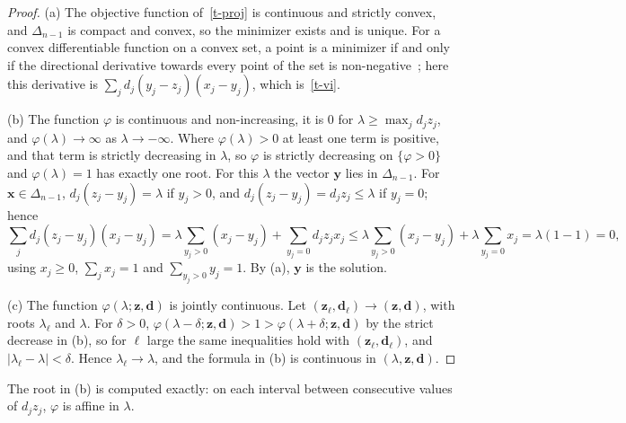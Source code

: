 \documentclass[11pt]{article}
\theoremstyle{plain}
\theoremstyle{remark}
\numberwithin{equation}{section}
\begin{document}
\begin{proof}
(a) The objective function of~\eqref{t-proj} is continuous and strictly convex,
and $\Delta_{n-1}$ is compact and convex, so the minimizer exists and is
unique. For a convex differentiable function on a convex set, a point is a
minimizer if and only if the directional derivative towards every point of the
set is non-negative~\cite[Section 4.2.3]{2004Boyd_Vandenberghe}; here this
derivative is $\sum_j d_j(y_j-z_j)(x_j-y_j)$, which is~\eqref{t-vi}.

(b) The function $\varphi$ is continuous and non-increasing, it is
$0$ for $\lambda\ge\max_j d_jz_j$, and $\varphi(\lambda)\to\infty$ as
$\lambda\to-\infty$. Where $\varphi(\lambda)>0$ at least one term is positive,
and that term is strictly decreasing in $\lambda$, so $\varphi$ is strictly
decreasing on $\{\varphi>0\}$ and $\varphi(\lambda)=1$ has exactly one root.
For this $\lambda$ the vector $\bm y$ lies in $\Delta_{n-1}$. For
$\bm x\in\Delta_{n-1}$, $d_j(z_j-y_j)=\lambda$ if $y_j>0$, and
$d_j(z_j-y_j)=d_jz_j\le\lambda$ if $y_j=0$; hence
\begin{equation}
\sum_j d_j(z_j-y_j)(x_j-y_j)
=\lambda\sum_{y_j>0}(x_j-y_j)+\sum_{y_j=0}d_jz_jx_j
\le\lambda\sum_{y_j>0}(x_j-y_j)+\lambda\sum_{y_j=0}x_j
=\lambda\left(1-1\right)=0,
\end{equation}
using $x_j\ge 0$, $\sum_jx_j=1$ and $\sum_{y_j>0}y_j=1$. By (a), $\bm y$ is the
solution.

(c) The function $\varphi(\lambda;\bm z,\bm d)$ is jointly continuous. Let
$(\bm z_\ell,\bm d_\ell)\to(\bm z,\bm d)$, with roots $\lambda_\ell$ and
$\lambda$. For $\delta>0$, $\varphi(\lambda-\delta;\bm z,\bm d)>1>\varphi(\lambda+\delta;\bm z,\bm d)$
by the strict decrease in (b), so for $\ell$ large the same inequalities hold
with $(\bm z_\ell,\bm d_\ell)$, and $|\lambda_\ell-\lambda|<\delta$. Hence
$\lambda_\ell\to\lambda$, and the formula in (b) is continuous in
$(\lambda,\bm z,\bm d)$.
\end{proof}

The root in (b) is computed exactly: on each interval between consecutive
values of $d_jz_j$, $\varphi$ is affine in $\lambda$.
\end{document}
